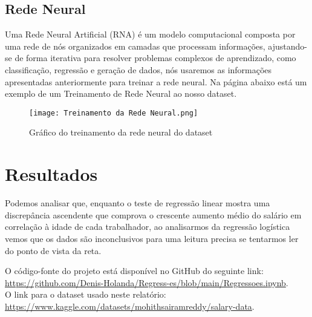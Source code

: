 \documentclass{article}
\begin{document}
\subsection{Rede Neural}

Uma Rede Neural Artificial (RNA) é um modelo computacional composta por uma rede de nós organizados em camadas que processam informações, ajustando-se de forma iterativa para resolver problemas complexos de aprendizado, como classificação, regressão e geração de dados, nós usaremos as informações apresentadas anteriormente para treinar a rede neural.
Na página abaixo está um exemplo de um Treinamento de Rede Neural ao nosso dataset.

\begin{figure}
    \centering
    \texttt{[image: Treinamento da Rede Neural.png]}
    \caption{\label{fig:frog}Gráfico do treinamento da rede neural do dataset}
\end{figure}


\newpage
\section{Resultados}

Podemos analisar que, enquanto o teste de regressão linear mostra uma discrepância ascendente que comprova o crescente aumento médio do salário em correlação à idade de cada trabalhador, ao analisarmos da regressão logística vemos que os dados são inconclusivos para uma leitura precisa se tentarmos ler do ponto de vista da reta.


\pagebreak




O código-fonte do projeto está disponível no GitHub do seguinte link:\\ \url{https://github.com/Denis-Holanda/Regress-es/blob/main/Regressoes.ipynb}.\\
O link para o dataset usado neste relatório:\\ \url{https://www.kaggle.com/datasets/mohithsairamreddy/salary-data}.
\end{document}
